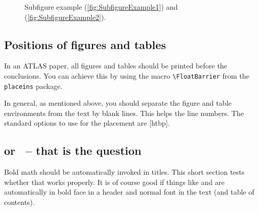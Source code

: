 \documentclass[atlasstyle,UKenglish]{latex/atlasdoc}
\newcommand{\Macro}[1]{\texttt{\textbackslash #1}\xspace}
\newcommand{\Option}[1]{\textsf{#1}\xspace}
\newcommand{\Package}[1]{\texttt{#1}\xspace}
\begin{document}
\begin{figure}[htbp]
  \centering
  \caption{Subfigure example (\ref{fig:SubfigureExample1}) and
    (\ref{fig:SubfigureExample2}).}
  \label{fig:subfigexample}
\end{figure}


\subsection{Positions of figures and tables}

In an ATLAS paper, all figures and tables should be printed before the conclusions.
You can achieve this by using the macro \Macro{FloatBarrier} from the
\Package{placeins} package.

In general, as mentioned above, you should separate the figure and table environments from the text by blank lines.
This helps the line numbers. The standard options to use for the placement are \Option{[htbp]}.


\subsection{\pT or \ET\ -- that is the question}

Bold math should be automatically invoked in titles.
This short section tests whether that works properly.
It is of course good if things like \pT and \ET are automatically in bold face in
a header and normal font in the text (and table of contents).
\end{document}
